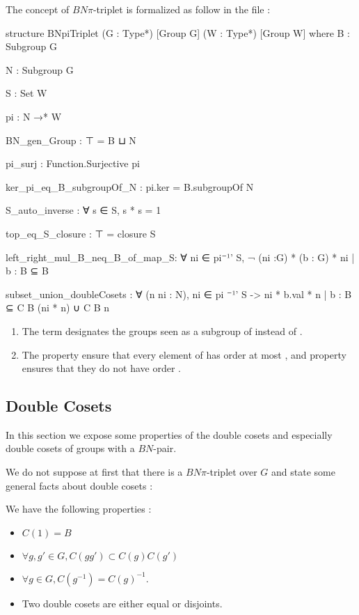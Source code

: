 The concept of $BN\pi$-triplet is formalized as follow in the  file :

\begin{leancode}
structure BNpiTriplet (G : Type*) [Group G] (W : Type*) [Group W] where
  B : Subgroup G

  N : Subgroup G
  
  S : Set W

  pi : N →* W

  BN_gen_Group : ⊤ = B ⊔ N

  pi_surj : Function.Surjective pi

  ker_pi_eq_B_subgroupOf_N : pi.ker = B.subgroupOf N

  S_auto_inverse : ∀ s ∈ S, s * s = 1

  top_eq_S_closure : ⊤ = closure S

  left_right_mul_B_neq_B_of_map_S: ∀ ni ∈ pi⁻¹' S,
    ¬ {(ni :G) * (b : G) * ni | b : B} ⊆  B

  subset_union_doubleCosets :  ∀ (n ni : N), ni ∈ pi ⁻¹' S ->
   {ni * b.val * n | b : B} ⊆ C B (ni * n) ∪ C B n
\end{leancode}

\begin{remarque}
    \begin{enumerate}
        \item The term  designates the groups  seen as a subgroup of  instead of .
        \item The property  ensure that every element of  has order at most , and property   ensures that they do not have order .
    \end{enumerate}
    
\end{remarque}

\subsection{Double Cosets}
\label{sub:Double Cosets}

In this section we expose some properties of the double cosets and especially double cosets of groups with a $BN$-pair.

We do not suppose at first that there is a $BN\pi$-triplet over $G$ and state some general facts about double cosets : 

\begin{proprietes} \label{prop:DC1}
    We have the following properties :
    \begin{itemize}
        \item  $C\left( 1 \right) = B$
        \item $\forall g,g'\in G,C\left( g g' \right) \subset C(g) C(g')$
        \item $\forall g \in G, C\left( g^{-1} \right) = C\left( g \right)^{-1}$.
        \item Two double cosets are either equal or disjoints.
    \end{itemize}
\end{proprietes}

